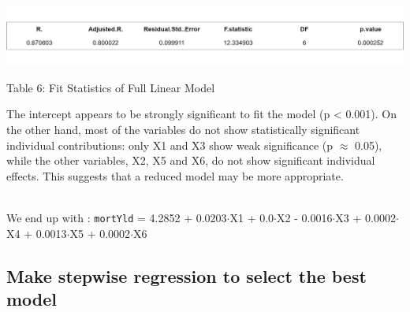 \documentclass[
  11pt,
]{article}
\begin{document}
\noindent
\includegraphics[width=0.9\linewidth,height=0.18\textheight]{full_model_fitstats_table.png}

\par

\small Table 6: Fit Statistics of Full Linear Model

\addtocounter{table}{2}

The intercept appears to be strongly significant to fit the model (p
\textless{} 0.001). On the other hand, most of the variables do not show
statistically significant individual contributions: only X1 and X3 show
weak significance (p \(\approx\) 0.05), while the other variables, X2,
X5 and X6, do not show significant individual effects. This suggests
that a reduced model may be more appropriate.\\
\strut \\
We end up with : \texttt{mortYld} = 4.2852 + 0.0203\(\cdot\)X1 +
0.0\(\cdot\)X2 - 0.0016\(\cdot\)X3 + 0.0002\(\cdot\)X4 +
0.0013\(\cdot\)X5 + 0.0002\(\cdot\)X6

\subsection{Make stepwise regression to select the best
model}\label{make-stepwise-regression-to-select-the-best-model}
\end{document}
